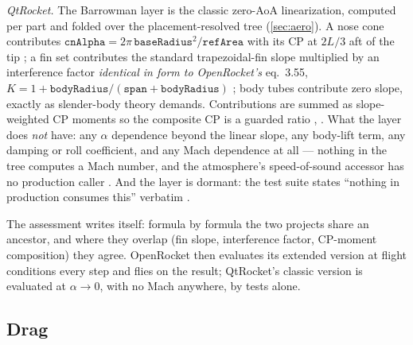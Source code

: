 \emph{QtRocket.} The Barrowman layer is the classic zero-AoA linearization, computed per
part and folded over the placement-resolved tree (\cref{sec:aero}). A nose cone contributes
$\mathtt{cnAlpha} = 2\pi\,\mathtt{baseRadius}^2/\mathtt{refArea}$ with its CP at $2L/3$ aft
of the tip ; a fin set contributes the standard
trapezoidal-fin slope  multiplied by an interference factor
\emph{identical in form to OpenRocket's} eq.~3.55,
$K = 1 + \mathtt{bodyRadius}/(\mathtt{span} + \mathtt{bodyRadius})$
; body tubes contribute zero slope, exactly as slender-body
theory demands. Contributions are summed as slope-weighted CP moments so the composite CP is
a guarded ratio , . What the layer does
\emph{not} have: any $\alpha$ dependence beyond the linear slope, any body-lift term, any
damping or roll coefficient, and any Mach dependence at all --- nothing in the tree computes
a Mach number, and the atmosphere's speed-of-sound accessor has no production caller
. And the layer is dormant: the test suite states
``nothing in production consumes this'' verbatim .

The assessment writes itself: formula by formula the two projects share an ancestor, and
where they overlap (fin slope, interference factor, CP-moment composition) they agree.
OpenRocket then evaluates its extended version at flight conditions every step and flies on
the result; QtRocket's classic version is evaluated at $\alpha \to 0$, with no Mach anywhere,
by tests alone.

\subsection{Drag}\label{app:or-methods-drag}

